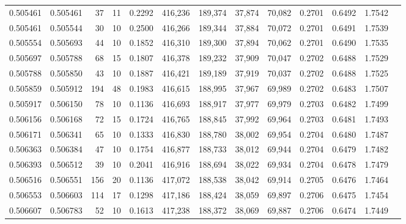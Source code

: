 \begin{tabular}{rrrrrrrrrrrrr}
0.505461 & 0.505461 &    37 &  11 &                                     0.2292 & 416,236 & 189,374 &  37,874 &  70,082 & 0.2701 & 0.6492 & 1.7542 \\
0.505461 & 0.505544 &    30 &  10 &                                     0.2500 & 416,266 & 189,344 &  37,884 &  70,072 & 0.2701 & 0.6491 & 1.7539 \\
0.505554 & 0.505693 &    44 &  10 &                                     0.1852 & 416,310 & 189,300 &  37,894 &  70,062 & 0.2701 & 0.6490 & 1.7535 \\
0.505697 & 0.505788 &    68 &  15 &                                     0.1807 & 416,378 & 189,232 &  37,909 &  70,047 & 0.2702 & 0.6488 & 1.7529 \\
0.505788 & 0.505850 &    43 &  10 &                                     0.1887 & 416,421 & 189,189 &  37,919 &  70,037 & 0.2702 & 0.6488 & 1.7525 \\
0.505859 & 0.505912 &   194 &  48 &                                     0.1983 & 416,615 & 188,995 &  37,967 &  69,989 & 0.2702 & 0.6483 & 1.7507 \\
0.505917 & 0.506150 &    78 &  10 &                                     0.1136 & 416,693 & 188,917 &  37,977 &  69,979 & 0.2703 & 0.6482 & 1.7499 \\
0.506156 & 0.506168 &    72 &  15 &                                     0.1724 & 416,765 & 188,845 &  37,992 &  69,964 & 0.2703 & 0.6481 & 1.7493 \\
0.506171 & 0.506341 &    65 &  10 &                                     0.1333 & 416,830 & 188,780 &  38,002 &  69,954 & 0.2704 & 0.6480 & 1.7487 \\
0.506363 & 0.506384 &    47 &  10 &                                     0.1754 & 416,877 & 188,733 &  38,012 &  69,944 & 0.2704 & 0.6479 & 1.7482 \\
0.506393 & 0.506512 &    39 &  10 &                                     0.2041 & 416,916 & 188,694 &  38,022 &  69,934 & 0.2704 & 0.6478 & 1.7479 \\
0.506516 & 0.506551 &   156 &  20 &                                     0.1136 & 417,072 & 188,538 &  38,042 &  69,914 & 0.2705 & 0.6476 & 1.7464 \\
0.506553 & 0.506603 &   114 &  17 &                                     0.1298 & 417,186 & 188,424 &  38,059 &  69,897 & 0.2706 & 0.6475 & 1.7454 \\
0.506607 & 0.506783 &    52 &  10 &                                     0.1613 & 417,238 & 188,372 &  38,069 &  69,887 & 0.2706 & 0.6474 & 1.7449 \\

\end{tabular}
